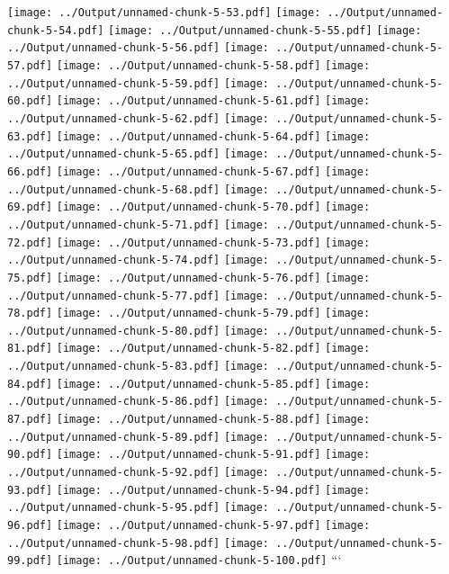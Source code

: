 \documentclass[
]{article}
\begin{document}
\texttt{[image: ../Output/unnamed-chunk-5-53.pdf]}
\texttt{[image: ../Output/unnamed-chunk-5-54.pdf]}
\texttt{[image: ../Output/unnamed-chunk-5-55.pdf]}
\texttt{[image: ../Output/unnamed-chunk-5-56.pdf]}
\texttt{[image: ../Output/unnamed-chunk-5-57.pdf]}
\texttt{[image: ../Output/unnamed-chunk-5-58.pdf]}
\texttt{[image: ../Output/unnamed-chunk-5-59.pdf]}
\texttt{[image: ../Output/unnamed-chunk-5-60.pdf]}
\texttt{[image: ../Output/unnamed-chunk-5-61.pdf]}
\texttt{[image: ../Output/unnamed-chunk-5-62.pdf]}
\texttt{[image: ../Output/unnamed-chunk-5-63.pdf]}
\texttt{[image: ../Output/unnamed-chunk-5-64.pdf]}
\texttt{[image: ../Output/unnamed-chunk-5-65.pdf]}
\texttt{[image: ../Output/unnamed-chunk-5-66.pdf]}
\texttt{[image: ../Output/unnamed-chunk-5-67.pdf]}
\texttt{[image: ../Output/unnamed-chunk-5-68.pdf]}
\texttt{[image: ../Output/unnamed-chunk-5-69.pdf]}
\texttt{[image: ../Output/unnamed-chunk-5-70.pdf]}
\texttt{[image: ../Output/unnamed-chunk-5-71.pdf]}
\texttt{[image: ../Output/unnamed-chunk-5-72.pdf]}
\texttt{[image: ../Output/unnamed-chunk-5-73.pdf]}
\texttt{[image: ../Output/unnamed-chunk-5-74.pdf]}
\texttt{[image: ../Output/unnamed-chunk-5-75.pdf]}
\texttt{[image: ../Output/unnamed-chunk-5-76.pdf]}
\texttt{[image: ../Output/unnamed-chunk-5-77.pdf]}
\texttt{[image: ../Output/unnamed-chunk-5-78.pdf]}
\texttt{[image: ../Output/unnamed-chunk-5-79.pdf]}
\texttt{[image: ../Output/unnamed-chunk-5-80.pdf]}
\texttt{[image: ../Output/unnamed-chunk-5-81.pdf]}
\texttt{[image: ../Output/unnamed-chunk-5-82.pdf]}
\texttt{[image: ../Output/unnamed-chunk-5-83.pdf]}
\texttt{[image: ../Output/unnamed-chunk-5-84.pdf]}
\texttt{[image: ../Output/unnamed-chunk-5-85.pdf]}
\texttt{[image: ../Output/unnamed-chunk-5-86.pdf]}
\texttt{[image: ../Output/unnamed-chunk-5-87.pdf]}
\texttt{[image: ../Output/unnamed-chunk-5-88.pdf]}
\texttt{[image: ../Output/unnamed-chunk-5-89.pdf]}
\texttt{[image: ../Output/unnamed-chunk-5-90.pdf]}
\texttt{[image: ../Output/unnamed-chunk-5-91.pdf]}
\texttt{[image: ../Output/unnamed-chunk-5-92.pdf]}
\texttt{[image: ../Output/unnamed-chunk-5-93.pdf]}
\texttt{[image: ../Output/unnamed-chunk-5-94.pdf]}
\texttt{[image: ../Output/unnamed-chunk-5-95.pdf]}
\texttt{[image: ../Output/unnamed-chunk-5-96.pdf]}
\texttt{[image: ../Output/unnamed-chunk-5-97.pdf]}
\texttt{[image: ../Output/unnamed-chunk-5-98.pdf]}
\texttt{[image: ../Output/unnamed-chunk-5-99.pdf]}
\texttt{[image: ../Output/unnamed-chunk-5-100.pdf]} ```
\end{document}
